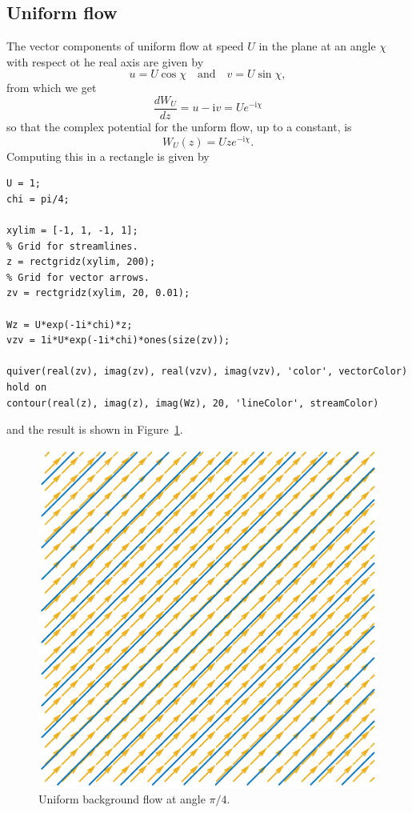 \documentclass[12pt,fleqn]{article}
\renewcommand{\i}{\mathrm{i}}
\begin{document}
\subsection{Uniform flow}
The vector components of uniform flow at speed $U$ in the plane at an angle $\chi$ with respect ot he real axis are given by
\[ u = U\cos\chi \quad\text{and}\quad v = U\sin \chi, \]
from which we get
\begin{equation*}
  \frac{dW_U}{dz} = u - \i v = Ue^{-\i\chi}
\end{equation*}
so that the complex potential for the unform flow, up to a constant, is
\begin{equation*}
  W_U(z) = Uze^{-\i\chi}.
\end{equation*}
Computing this in a rectangle is given by
\begin{lstlisting}
U = 1;
chi = pi/4;

xylim = [-1, 1, -1, 1];
% Grid for streamlines.
z = rectgridz(xylim, 200);
% Grid for vector arrows.
zv = rectgridz(xylim, 20, 0.01);

Wz = U*exp(-1i*chi)*z;
vzv = 1i*U*exp(-1i*chi)*ones(size(zv));

quiver(real(zv), imag(zv), real(vzv), imag(vzv), 'color', vectorColor)
hold on
contour(real(z), imag(z), imag(Wz), 20, 'lineColor', streamColor)
\end{lstlisting}
and the result is shown in Figure~\ref{fig:simpleuniform}.
\begin{figure}[htb]
  \centering
  \includegraphics[height=.4\textheight]{figures/simpleuniform.eps}
  \caption{Uniform background flow at angle $\pi/4$.}
  \label{fig:simpleuniform}
\end{figure}
\end{document}
